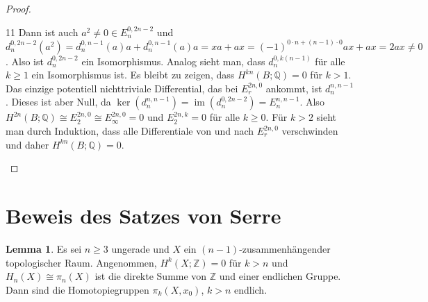 \documentclass[11pt, a4paper, german]{article}
\theoremstyle{definition}
\newtheorem{lem}{Lemma}
\theoremstyle{remark}
\newcommand{\Z}{\mathbb{Z}} %
\newcommand{\Q}{\mathbb{Q}} %
\DeclareMathOperator{\im}{im} %
\begin{document}
\begin{proof}
\begin{cutout}{0}{0pt}{\dimexpr\linewidth-5.5cm\relax}{11}
    Dann ist auch $a^2 \neq 0 \in E_n^{0,2n-2}$ und $d_n^{0,2n-2}(a^2) = d_n^{0,n-1}(a)a + d_n^{0,n-1}(a)a = xa + ax = (-1)^{0 \cdot n + (n-1) \cdot 0} ax + ax = 2ax \neq 0$.
    Also ist $d_n^{0,2n-2}$ ein Isomorphismus.
    Analog sieht man, dass $d_n^{0,k(n-1)}$ für alle $k \geq 1$ ein Isomorphismus ist.
    Es bleibt zu zeigen, dass $H^{kn}(B; \Q) = 0$ für $k > 1$.
    Das einzige potentiell nichttriviale Differential, das bei $E_r^{2n,0}$ ankommt, ist $d_n^{n,n-1}$.
    Dieses ist aber Null, da $\ker(d_n^{n,n-1}) = \im(d_n^{0,2n-2}) = E_n^{n,n-1}$.
    Also $H^{2n}(B; \Q) \cong E_2^{2n,0} \cong E_\infty^{2n,0} = 0$ und $E_2^{2n,k} = 0$ für alle $k \geq 0$.
    Für $k > 2$ sieht man durch Induktion, dass alle Differentiale von und nach $E_r^{2n,0}$ verschwinden und daher $H^{kn}(B; \Q) = 0$.
  \end{cutout}
\end{proof}

\section{Beweis des Satzes von Serre}

\begin{lem}
  Es sei $n \geq 3$ ungerade und $X$ ein $(n{-}1)$-zusammenhängender topologischer Raum.
  Angenommen, $H^k(X; \Z) = 0$ für $k > n$ und $H_n(X) \cong \pi_n(X)$ ist die direkte Summe von $\Z$ und einer endlichen Gruppe.
  Dann sind die Homotopiegruppen $\pi_k(X, x_0)$, $k > n$ endlich.
\end{lem}
\end{document}
